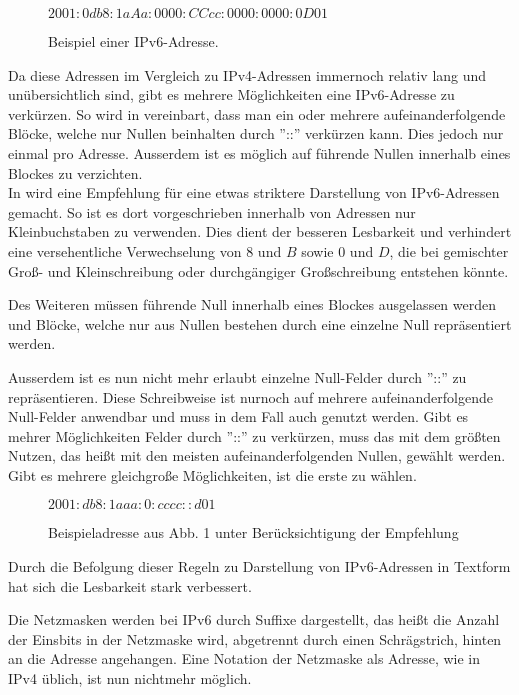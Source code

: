 \documentclass[a4paper, 12pt]{scrartcl}
\begin{document}
\begin{figure}[h]
	\centering
	$2001:0db8:1aAa:0000:CCcc:0000:0000:0D01$
	\caption{Beispiel einer IPv6-Adresse.}
\end{figure}


Da diese Adressen im Vergleich zu IPv4-Adressen immernoch relativ lang und unübersichtlich sind, gibt es mehrere Möglichkeiten eine IPv6-Adresse zu verkürzen.
So wird in \cite{rfc4291} vereinbart, dass man ein oder mehrere aufeinanderfolgende Blöcke, welche nur Nullen beinhalten durch ''::'' verkürzen kann. Dies jedoch nur einmal pro Adresse.
Ausserdem ist es möglich auf führende Nullen innerhalb eines Blockes zu verzichten. \\


In \cite{rfc5952} wird eine Empfehlung für eine etwas striktere Darstellung von IPv6-Adressen gemacht.
So ist es dort vorgeschrieben innerhalb von Adressen nur Kleinbuchstaben zu verwenden. Dies dient der besseren Lesbarkeit und verhindert eine versehentliche Verwechselung von $8$ und $B$ sowie $0$ und $D$, die bei gemischter Groß- und Kleinschreibung oder durchgängiger Großschreibung entstehen könnte.

Des Weiteren müssen führende Null innerhalb eines Blockes ausgelassen werden und Blöcke, welche nur aus Nullen bestehen durch eine einzelne Null repräsentiert werden.

Ausserdem ist es nun nicht mehr erlaubt einzelne Null-Felder durch ''::'' zu repräsentieren. Diese Schreibweise ist nurnoch auf mehrere aufeinanderfolgende Null-Felder anwendbar und muss in dem Fall auch genutzt werden. Gibt es mehrer Möglichkeiten Felder durch ''::'' zu verkürzen, muss das mit dem größten Nutzen, das heißt mit den meisten aufeinanderfolgenden Nullen, gewählt werden. Gibt es mehrere gleichgroße Möglichkeiten, ist die erste zu wählen.


\begin{figure}[h]
	\centering
	$2001:db8:1aaa:0:cccc::d01$
	\caption{Beispieladresse aus Abb. 1 unter Berücksichtigung der Empfehlung}
\end{figure}

Durch die Befolgung dieser Regeln zu Darstellung von IPv6-Adressen in Textform hat sich die Lesbarkeit stark verbessert.

Die Netzmasken werden bei IPv6 durch Suffixe dargestellt, das heißt die Anzahl der Einsbits in der Netzmaske wird, abgetrennt durch einen Schrägstrich, hinten an die Adresse angehangen.
Eine Notation der Netzmaske als Adresse, wie in IPv4 üblich, ist nun nichtmehr möglich.
\end{document}
